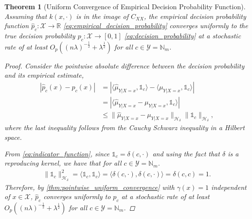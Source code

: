 \documentclass{article}
\newtheorem{theorem}{Theorem}[section]
\begin{document}
	\begin{theorem}[Uniform Convergence of Empirical Decision Probability Function]
		\label{thm:probability_convergence}
		Assuming that $k(x, \cdot)$ is in the image of $C_{XX}$, the empirical decision probability function $\hat{p}_{c} : \mathcal{X} \to \mathbb{R}$ \eqref{eq:empirical_decision_probability} converges uniformly to the true decision probability $p_{c} : \mathcal{X} \to [0, 1]$ \eqref{eq:decision_probability} at a stochastic rate of at least $O_{p}((n \lambda)^{-\frac{1}{2}} + \lambda^{\frac{1}{2}})$ for all $c \in \mathcal{Y} = \mathbb{N}_{m}$.
		
		\begin{proof}

			Consider the pointwise absolute difference between the decision probability and its empirical estimate,
			\begin{equation}
				\begin{aligned}
					| \hat{p}_{c}(x) - p_{c}(x) | &= | \langle \hat{\mu}_{Y | X = x}, \mathbb{1}_{c} \rangle - \langle \mu_{Y | X = x}, \mathbb{1}_{c} \rangle | \\
					&= | \langle \hat{\mu}_{Y | X = x} - \mu_{Y | X = x}, \mathbb{1}_{c} \rangle | \\
					&\leq \big\| \hat{\mu}_{Y | X = x} - \mu_{Y | X = x} \big\|_{\mathcal{H}_{\delta}} \big\| \mathbb{1}_{c} \big\|_{\mathcal{H}_{\delta}},
				\label{eq:decision_probability_error_upper_bound}
				\end{aligned}
			\end{equation}
			where the last inequality follows from the Cauchy Schwarz inequality in a Hilbert space.
			
			From \eqref{eq:indicator_function}, since $\mathbb{1}_{c} = \delta(c, \cdot)$ and using the fact that $\delta$ is a reproducing kernel, we have that for all $c \in \mathcal{Y} = \mathbb{N}_{m}$.
			\begin{equation}
				\begin{aligned}
					\big\| \mathbb{1}_{c} \big\|_{\mathcal{H}_{\delta}}^{2} = \langle \mathbb{1}_{c}, \mathbb{1}_{c} \rangle = \langle \delta(c, \cdot), \delta(c, \cdot) \rangle = \delta(c, c) = 1.
				\label{eq:indicator_rkhs_norm}
				\end{aligned}
			\end{equation}
			Therefore, by \cref{thm:pointwise_uniform_convergence} with $\gamma(x) = 1$ independent of $x \in \mathcal{X}$, $\hat{p}_{c}$ converges uniformly to $p_{c}$ at a stochastic rate of at least $O_{p}((n \lambda)^{-\frac{1}{2}} + \lambda^{\frac{1}{2}})$ for all $c \in \mathcal{Y} = \mathbb{N}_{m}$.
			
		\end{proof}
	\end{theorem}
	
\end{document}
